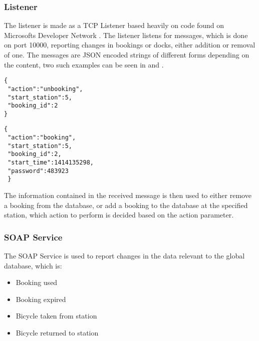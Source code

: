 \subsubsection{Listener}\label{subsubsec:listener}
The listener is made as a TCP Listener based heavily on code found on Microsofts Developer Network \citep{misc:TcpListenerSource}. 
The listener listens for messages, which is done on port 10000, reporting changes in bookings or docks, either addition or removal of one. 
The messages are JSON encoded strings of different forms depending on the content, two such examples can be seen in  and .

\begin{minipage}{\textwidth}
\begin{minipage}{0.45\textwidth}
\begin{lstlisting}[caption = {Example of an unbooking message}, label = {lst:JsonUnbooking}]
{
 "action":"unbooking",
 "start_station":5,
 "booking_id":2
}
\end{lstlisting}
\end{minipage}
\hspace{0.5cm}
\begin{minipage}{0.45\textwidth}
\begin{lstlisting}[caption = {Example of a booking message}, label = {lst:JsonBooking}]
{
 "action":"booking",
 "start_station":5,
 "booking_id":2,
 "start_time":1414135298,
 "password":483923
 }
\end{lstlisting}
\end{minipage}
\end{minipage}

The information contained in the received message is then used to either remove a booking from the database, or add a booking to the database at the specified station, which action to perform is decided based on the action parameter.

\subsubsection{SOAP Service}
The SOAP Service is used to report changes in the data relevant to the global database, which is:

\begin{itemize}
\item Booking used
\item Booking expired
\item Bicycle taken from station
\item Bicycle returned to station
\end{itemize}

